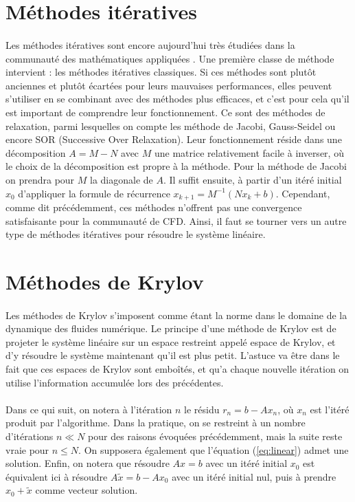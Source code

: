 \section{Méthodes itératives}

	\paragraph{}
	Les méthodes itératives sont encore aujourd'hui très étudiées dans la communauté des mathématiques appliquées \cite{OlshanskiiTyrtyshnikov2014, Saad2003, TrefethenBau1997}.
	Une première classe de méthode intervient : les méthodes itératives classiques.
	Si ces méthodes sont plutôt anciennes et plutôt écartées pour leurs mauvaises performances, elles peuvent s'utiliser en se combinant avec des méthodes plus efficaces, et c'est pour cela qu'il est important de comprendre leur fonctionnement.
	Ce sont des méthodes de relaxation, parmi lesquelles on compte les méthode de Jacobi, Gauss-Seidel ou encore SOR (Successive Over Relaxation).
	Leur fonctionnement réside dans une décomposition $A = M - N$ avec $M$ une matrice relativement facile à inverser, où le choix de la décomposition est propre à la méthode.
	Pour la méthode de Jacobi on prendra pour $M$ la diagonale de $A$.
	Il suffit ensuite, à partir d'un itéré initial $x_0$ d'appliquer la formule de récurrence $x_{k+1} = M^{-1}\left(Nx_k + b\right)$.
	Cependant, comme dit précédemment, ces méthodes n'offrent pas une convergence satisfaisante pour la communauté de CFD.
	Ainsi, il faut se tourner vers un autre type de méthodes itératives pour résoudre le système linéaire.


\section{Méthodes de Krylov}

	\paragraph{}
	Les méthodes de Krylov s'imposent comme étant la norme dans le domaine de la dynamique des fluides numérique.
	Le principe d'une méthode de Krylov est de projeter le système linéaire sur un espace restreint appelé espace de Krylov, et d'y résoudre le système maintenant qu'il est plus petit.
	L'astuce va être dans le fait que ces espaces de Krylov sont emboîtés, et qu'a chaque nouvelle itération on utilise l'information accumulée lors des précédentes.

	\paragraph{}
	Dans ce qui suit, on notera à l'itération $n$ le résidu $r_n = b - Ax_n$, où $x_n$ est l'itéré produit par l'algorithme.
	Dans la pratique, on se restreint à un nombre d'itérations $n\ll N$ pour des raisons évoquées précédemment, mais la suite reste vraie pour $n\le N$.
	On supposera également que l'équation (\ref{eq:linear}) admet une solution.
	Enfin, on notera que résoudre $Ax = b$ avec un itéré initial $x_0$ est équivalent ici à résoudre $A\tilde{x} = b - Ax_0$ avec un itéré initial nul, puis à prendre $x_0 + \tilde{x}$ comme vecteur solution.

